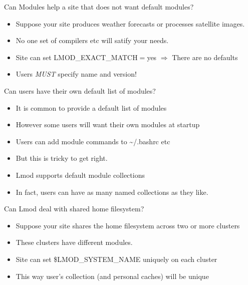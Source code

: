 \documentclass{beamer}
\begin{document}
\begin{frame}{Can Modules help a site that does not want default modules?}
  \begin{itemize}
    \item Suppose your site produces weather forecasts or processes
      satellite images.
    \item No one set of compilers etc will satify your needs.
    \item Site can set LMOD\_EXACT\_MATCH$=$yes $\Rightarrow$ There are no defaults
    \item Users \emph{MUST} specify name and version!
  \end{itemize}
\end{frame}

\begin{frame}{Can users have their own default list of modules?}
  \begin{itemize}
    \item It is common to provide a default list of modules
    \item However some users will want their own modules at startup
    \item Users can add module commands to \textasciitilde/.bashrc etc
    \item But this is tricky to get right.
    \item Lmod supports default module collections
    \item In fact, users can have as many named collections as they like.
  \end{itemize}
\end{frame}


\begin{frame}{Can Lmod deal with shared home filesystem?}
  \begin{itemize}
    \item Suppose your site shares the home filesystem across two or
      more clusters
    \item These clusters have different modules.
    \item Site can set \$LMOD\_SYSTEM\_NAME uniquely on each cluster
    \item This way user's collection (and personal caches) will be
      unique
  \end{itemize}
\end{frame}
\end{document}
